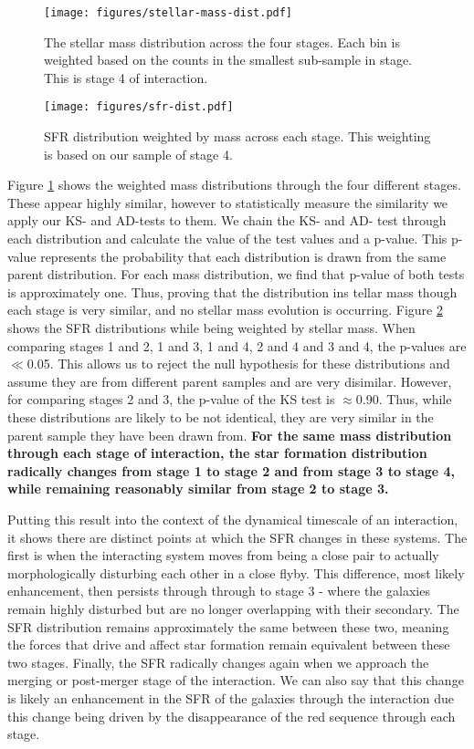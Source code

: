 \documentclass[fleqn,usenatbib]{mnras}
\begin{document}
\begin{figure}
    \centering
    \texttt{[image: figures/stellar-mass-dist.pdf]}
    \caption{The stellar mass distribution across the four stages. Each bin is weighted based on the counts in the smallest sub-sample in stage. This is stage 4 of interaction.}
    \label{fig:weighted-mass}
\end{figure}

\begin{figure}
    \centering
    \texttt{[image: figures/sfr-dist.pdf]}
    \caption{SFR distribution weighted by mass across each stage. This weighting is based on our sample of stage 4.}
    \label{fig:weighted-sfr}
\end{figure}

Figure \ref{fig:weighted-mass} shows the weighted mass distributions through the four different stages. These appear highly similar, however to statistically measure the similarity we apply our KS- and AD-tests to them. We chain the KS- and AD- test through each distribution and calculate the value of the test values and a p-value. This p-value represents the probability that each distribution is drawn from the same parent distribution. For each mass distribution, we find that p-value of both tests is approximately one. Thus, proving that the distribution ins tellar mass though each stage is very similar, and no stellar mass evolution is occurring. Figure \ref{fig:weighted-sfr} shows the SFR distributions while being weighted by stellar mass. When comparing stages 1 and 2, 1 and 3, 1 and 4, 2 and 4 and 3 and 4, the p-values are $\ll$0.05. This allows us to reject the null hypothesis for these distributions and assume they are from different parent samples and are very disimilar. However, for comparing stages 2 and 3, the p-value of the KS test is $\approx$0.90. Thus, while these distributions are likely to be not identical, they are very similar in the parent sample they have been drawn from. \textbf{For the same mass distribution through each stage of interaction, the star formation distribution radically changes from stage 1 to stage 2 and from stage 3 to stage 4, while remaining reasonably similar from stage 2 to stage 3.}

Putting this result into the context of the dynamical timescale of an interaction, it shows there are distinct points at which the SFR changes in these systems. The first is when the interacting system moves from being a close pair to actually morphologically disturbing each other in a close flyby. This difference, most likely enhancement, then persists through through to stage 3 - where the galaxies remain highly disturbed but are no longer overlapping with their secondary. The SFR distribution remains approximately the same between these two, meaning the forces that drive and affect star formation remain equivalent between these two stages. Finally, the SFR radically changes again when we approach the merging or post-merger stage of the interaction. We can also say that this change is likely an enhancement in the SFR of the galaxies through the interaction due this change being driven by the disappearance of the red sequence through each stage.
\end{document}
